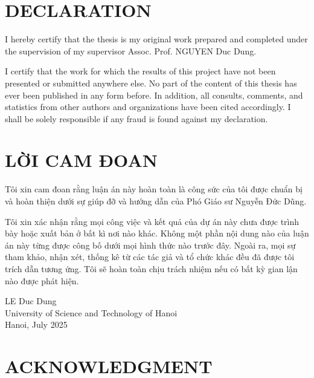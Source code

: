 \documentclass{article}
\begin{document}
\tableofcontents
\newpage

\section*{DECLARATION}
{}
\vspace{0.25cm}

I hereby certify that the thesis is my original work prepared and completed under the supervision of my supervisor Assoc. Prof. NGUYEN Duc Dung.

\vspace{0.5cm}
\noindent I certify that the work for which the results of this project have not been presented or submitted anywhere else. No part of the content of this thesis has ever been published in any form before. In addition, all consults, comments, and statistics from other authors and organizations have been cited accordingly. I shall be solely responsible if any fraud is found against my declaration.

\vspace{3cm}
\section*{LỜI CAM ĐOAN}
\vspace{0.25cm}

Tôi xin cam đoan rằng luận án này hoàn toàn là công sức của tôi được chuẩn bị và hoàn thiện dưới sự giúp đỡ và hướng dẫn của Phó Giáo sư Nguyễn Đức Dũng.

\vspace{0.5cm}
\noindent Tôi xin xác nhận rằng mọi công việc và kết quả của dự án này chưa được trình bày hoặc xuất bản ở bất kì nơi nào khác. Không một phần nội dung nào của luận án này từng được công bố dưới mọi hình thức nào trước đây. Ngoài ra, mọi sự tham khảo, nhận xét, thống kê từ các tác giả và tổ chức khác đều đã được tôi trích dẫn tương ứng. Tôi sẽ hoàn toàn chịu trách nhiệm nếu có bất kỳ gian lận nào được phát hiện.

\vspace{8cm} 
\noindent LE Duc Dung \\
\noindent University of Science and Technology of Hanoi \\
\noindent Hanoi, July 2025
\newpage

\section*{ACKNOWLEDGMENT}
{}
\vspace{0.25cm}
\end{document}
